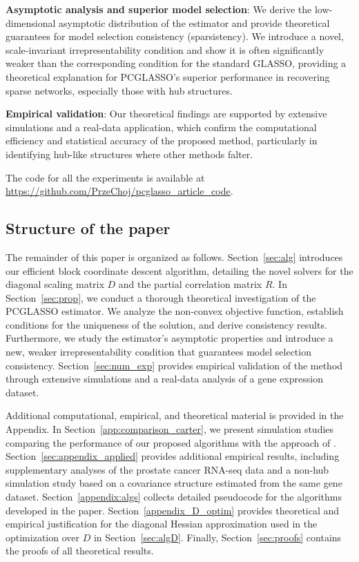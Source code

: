 \documentclass[12pt]{amsart}
\numberwithin{equation}{section}
\numberwithin{equation}{section}
\theoremstyle{plain}
\theoremstyle{definition}
\begin{document}
\textbf{Asymptotic analysis and superior model selection}: We derive the low-dimen\-sional asymptotic distribution of the estimator and provide theoretical guarantees for model selection consistency (sparsistency). We introduce a novel, scale-invariant irrepresentability condition and show it is often significantly weaker than the corresponding condition for the standard GLASSO, providing a theoretical explanation for PCGLASSO's superior performance in recovering sparse networks, especially those with hub structures.

\textbf{Empirical validation}: Our theoretical findings are supported by extensive simulations and a real-data application, which confirm the computational efficiency and statistical accuracy of the proposed method, particularly in identifying hub-like structures where other methods falter.

The code for all the experiments is available at \url{https://github.com/PrzeChoj/pcglasso_article_code}.

\subsection{Structure of the paper}

The remainder of this paper is organized as follows. Section~\ref{sec:alg} introduces our efficient block coordinate descent algorithm, detailing the novel solvers for the diagonal scaling matrix $D$ and the partial correlation matrix $R$. In Section~\ref{sec:prop}, we conduct a thorough theoretical investigation of the PCGLASSO estimator. We analyze the non-convex objective function, establish conditions for the uniqueness of the solution, and derive consistency results. Furthermore, we study the estimator's asymptotic properties and introduce a new, weaker irrepresentability condition that guarantees model selection consistency. Section~\ref{sec:num_exp} provides empirical validation of the method through extensive simulations and a real-data analysis of a gene expression dataset. 

Additional computational, empirical, and theoretical material is provided in the Appendix. 
In Section~\ref{app:comparison_carter}, we present simulation studies comparing the performance of our proposed algorithms with the approach of \cite{carter_arxiv_2025}. Section~\ref{sec:appendix_applied} provides additional empirical results, including supplementary analyses of the prostate cancer RNA-seq data and a non-hub simulation study based on a covariance structure estimated from the same gene dataset.
  Section~\ref{appendix:algs} collects detailed pseudocode for the algorithms developed in the paper.
 Section~\ref{appendix_D_optim} provides theoretical and empirical justification for the diagonal Hessian approximation used in the optimization over $D$ in Section~\ref{sec:algD}. 
Finally, Section~\ref{sec:proofs} contains the proofs of all theoretical results. 
\end{document}
